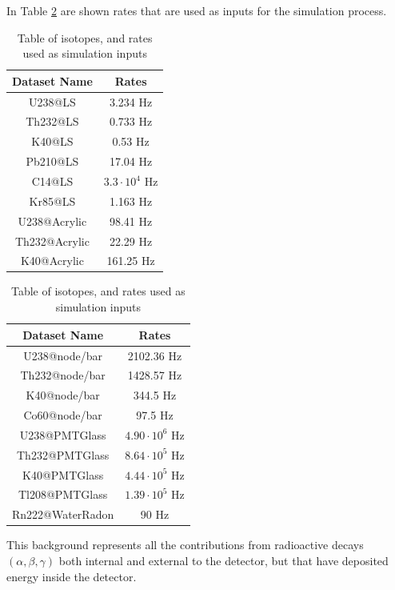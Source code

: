 In Table \ref{tab:BKG_gen} are shown rates that are used as inputs for the simulation process.

\begin{table}[htp]
	\begin{minipage}[t]{0.45\linewidth}
		\centering
		\small
		\begin{tabular}{cc}
			\toprule
			\textbf{Dataset Name} & \textbf{Rates} \\
			\midrule
			U238@LS  & 3.234 Hz \\
			Th232@LS & 0.733 Hz \\
			K40@LS  & 0.53 Hz \\
			Pb210@LS  & 17.04 Hz \\
			C14@LS  & $3.3 \cdot 10^{4}$ Hz \\
			Kr85@LS  & 1.163 Hz \\
			U238@Acrylic  & 98.41 Hz \\
			Th232@Acrylic  & 22.29 Hz \\
			K40@Acrylic  & 161.25 Hz \\
			\bottomrule
		\end{tabular}
	\end{minipage}
\hspace{0.5cm}
	\begin{minipage}[t]{0.45\linewidth}
		\centering
		\small
		\begin{tabular}{cc}
			\toprule
			\textbf{Dataset Name} & \textbf{Rates}  \\
			\midrule
			U238@node/bar  & 2102.36 Hz \\
			Th232@node/bar  & 1428.57 Hz \\
			K40@node/bar  & 344.5 Hz \\
			Co60@node/bar  & 97.5 Hz \\
			U238@PMTGlass  & $4.90 \cdot  10^{6}$ Hz \\
			Th232@PMTGlass  & $8.64 \cdot  10^{5}$ Hz \\
			K40@PMTGlass  & $4.44 \cdot  10^{5}$ Hz \\
			Tl208@PMTGlass  & $1.39 \cdot  10^{5}$ Hz \\
			Rn222@WaterRadon  & 90 Hz \\
			\bottomrule
		\end{tabular}
	\end{minipage}
	\caption{Table of isotopes, and rates used as simulation inputs}
	\label{tab:BKG_gen}
\end{table}

This background represents all the contributions from radioactive decays $(\alpha, \beta, \gamma)$ both internal and external to the detector, but that have deposited energy inside the detector.

